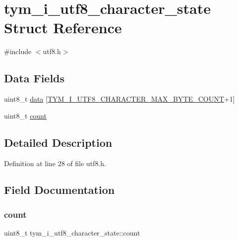 \hypertarget{structtym__i__utf8__character__state}{}\section{tym\+\_\+i\+\_\+utf8\+\_\+character\+\_\+state Struct Reference}
\label{structtym__i__utf8__character__state}


{\ttfamily \#include $<$utf8.\+h$>$}

\subsection*{Data Fields}
\begin{DoxyCompactItemize}
\item 
uint8\+\_\+t \hyperlink{structtym__i__utf8__character__state_abf1a561ec12ca40c15493dd3a46cfc8b}{data} \mbox{[}\hyperlink{utf8_8h_abed82baf7f470b522273a3e37c24c600a1371d2f9f9df00dc4e1582bb74b59f3e}{T\+Y\+M\+\_\+\+I\+\_\+\+U\+T\+F8\+\_\+\+C\+H\+A\+R\+A\+C\+T\+E\+R\+\_\+\+M\+A\+X\+\_\+\+B\+Y\+T\+E\+\_\+\+C\+O\+U\+NT}+1\mbox{]}
\item 
uint8\+\_\+t \hyperlink{structtym__i__utf8__character__state_ad73992572212253327f7498f63349632}{count}
\end{DoxyCompactItemize}


\subsection{Detailed Description}


Definition at line 28 of file utf8.\+h.



\subsection{Field Documentation}
\mbox{\label{structtym__i__utf8__character__state_ad73992572212253327f7498f63349632}} 
\subsubsection{\texorpdfstring{count}{count}}
{\footnotesize\ttfamily uint8\+\_\+t tym\+\_\+i\+\_\+utf8\+\_\+character\+\_\+state\+::count}



